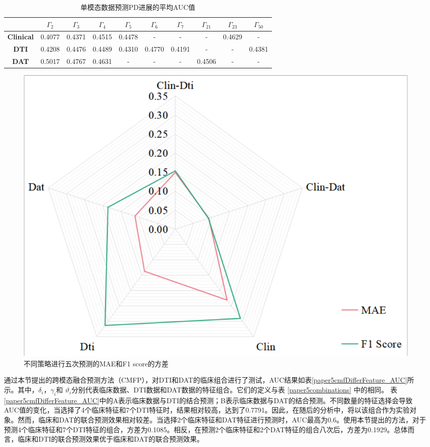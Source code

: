 \begin{table}[ht]
\centering
\caption{单模态数据预测PD进展的平均AUC值}
\label{paper5singalAvg_AUC}
\footnotesize
\begin{tabular}{cccccccccc}
\hline \hline
  & \textbf{$\Gamma_2$} & \textbf{$\Gamma_3$} & \textbf{$\Gamma_4$} & \textbf{$\Gamma_5$} & \textbf{$\Gamma_6$} & \textbf{$\Gamma_7$} & \textbf{$\Gamma_{21}$} & \textbf{$\Gamma_{23}$} & \textbf{$\Gamma_{50}$} \\ \hline
\textbf{Clinical}     & 0.4077      & 0.4371      & 0.4515      & 0.4478      & -           & -           & -            & 0.4629       & -            \\
\textbf{DTI}          & 0.4208      & 0.4476      & 0.4489      & 0.4310      & 0.4770      & 0.4191      & -            & -            & 0.4381       \\
\textbf{DAT}          & 0.5017      & 0.4767      & 0.4631      & -           & -           & -           & 0.4506       & -            & -      \\ \hline    \hline  
\end{tabular}
\end{table}

   \begin{figure}[ht]
      \centering
      \includegraphics[width=0.85\linewidth]{figs/paper5MAEF1SCOREvariance.pdf}
      \caption{不同策略进行五次预测的MAE和F1 score的方差}\label{paper5MAEF1variance}
     \end{figure}

通过本节提出的跨模态融合预测方法（CMFP），对DTI和DAT的临床组合进行了测试，AUC结果如表\ref{paper5cmfDifferFeature_AUC}所示。其中，$\delta_i$，$\gamma_i$和 $\vartheta_i$分别代表临床数据、DTI数据和DAT数据的特征组合。它们的定义与表 \ref{paper5combinations} 中的相同。 表\ref{paper5cmfDifferFeature_AUC}中的A表示临床数据与DTI的结合预测；B表示临床数据与DAT的结合预测。不同数量的特征选择会导致AUC值的变化，当选择了4个临床特征和7个DTI特征时，结果相对较高，达到了0.7791。因此，在随后的分析中，将以该组合作为实验对象。然而，临床和DAT的联合预测效果相对较差。当选择2个临床特征和DAT特征进行预测时，AUC最高为0.6。使用本节提出的方法，对于预测4个临床特征和7个DTI特征的组合，方差为0.1085。相反，在预测2个临床特征和2个DAT特征的组合八次后，方差为0.1929。总体而言，临床和DTI的联合预测效果优于临床和DAT的联合预测效果。


